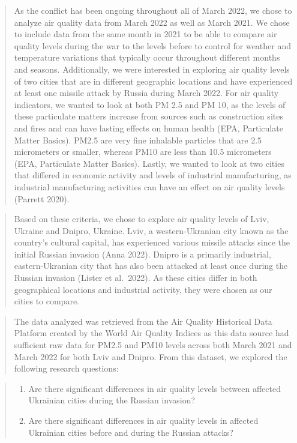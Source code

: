\documentclass[
  12pt,
]{article}
\providecommand{\tightlist}{%
  \setlength{\itemsep}{0pt}\setlength{\parskip}{0pt}}
\begin{document}
\begin{quote}
As the conflict has been ongoing throughout all of March 2022, we chose
to analyze air quality data from March 2022 as well as March 2021. We
chose to include data from the same month in 2021 to be able to compare
air quality levels during the war to the levels before to control for
weather and temperature variations that typically occur throughout
different months and seasons. Additionally, we were interested in
exploring air quality levels of two cities that are in different
geographic locations and have experienced at least one missile attack by
Russia during March 2022. For air quality indicators, we wanted to look
at both PM 2.5 and PM 10, as the levels of these particulate matters
increase from sources such as construction sites and fires and can have
lasting effects on human health (EPA, Particulate Matter Basics). PM2.5
are very fine inhalable particles that are 2.5 micrometers or smaller,
whereas PM10 are less than 10.5 micrometers (EPA, Particulate Matter
Basics). Lastly, we wanted to look at two cities that differed in
economic activity and levels of industrial manufacturing, as industrial
manufacturing activities can have an effect on air quality levels
(Parrett 2020).
\end{quote}

\begin{quote}
Based on these criteria, we chose to explore air quality levels of Lviv,
Ukraine and Dnipro, Ukraine. Lviv, a western-Ukranian city known as the
country's cultural capital, has experienced various missile attacks
since the initial Russian invasion (Anna 2022). Dnipro is a primarily
industrial, eastern-Ukranian city that has also been attacked at least
once during the Russian invasion (Lister et al.~2022). As these cities
differ in both geographical locations and industrial activity, they were
chosen as our cities to compare.
\end{quote}

\begin{quote}
The data analyzed was retrieved from the Air Quality Historical Data
Platform created by the World Air Quality Indices as this data source
had sufficient raw data for PM2.5 and PM10 levels across both March 2021
and March 2022 for both Lviv and Dnipro. From this dataset, we explored
the following research questions:
\end{quote}

\begin{quote}
\begin{enumerate}
\def\labelenumi{\arabic{enumi})}
\tightlist
\item
  Are there significant differences in air quality levels between
  affected Ukrainian cities during the Russian invasion?
\item
  Are there significant differences in air quality levels in affected
  Ukrainian cities before and during the Russian attacks?
\end{enumerate}
\end{quote}
\end{document}
